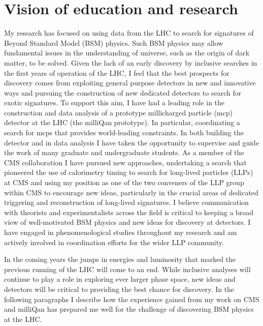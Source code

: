 \documentclass[11pt]{article}
\theoremstyle{plain} \numberwithin{equation}{section}
\theoremstyle{definition}
\newcounter{list}
\begin{document}
\section*{Vision of education and research}
\noindent 

My research has focused on using data from the 
LHC to search for signatures of Beyond 
Standard Model (BSM) physics. Such BSM physics may allow fundamental issues
in the understanding of universe, such as the origin of dark matter, 
to be solved. Given the lack of an early discovery by inclusive searches in the first
years of operation of the LHC, I feel that the best prospects for discovery comes from exploiting 
general purpose detectors in new and innovative ways and pursuing the construction
of new dedicated detectors to search for exotic signatures. To support
this aim, I have had a leading role in the construction and
data analysis of a prototype millicharged particle (mcp) detector
at the LHC (the milliQan prototype). In particular,
coordinating a search for mcps
that provides world-leading constraints. 
In both building the detector and in data analysis I have taken
the opportunity to supervise and guide the work of 
many graduate and undergraduate students. As a member of the CMS collaboration 
I have pursued new approaches, undertaking a 
search that pioneered the use of calorimetry timing 
to search for long-lived particles (LLPs) at CMS and using my position as one of 
the two conveners of the LLP group within CMS to encourage new ideas, particularly in
the crucial areas of dedicated triggering and reconstruction of long-lived signatures.
I believe communication with theorists and experimentalists
across the field is critical to keeping a broad view of well-motivated
BSM physics and new ideas for discovery at detectors. I have engaged
in phenomenological studies throughout my research and am
actively involved in coordination efforts for the wider LLP community.

In the coming years the jumps in energies and luminosity that marked the previous running of the 
LHC will come to an end. While inclusive analyses will continue to play a role in 
exploring ever larger phase space, new ideas and detectors will be critical to 
providing the best chance for discovery. In the following paragraphs I describe how the experience 
gained from my work on CMS and milliQan has prepared me well for the challenge 
of discovering BSM physics at the LHC.
\end{document}
